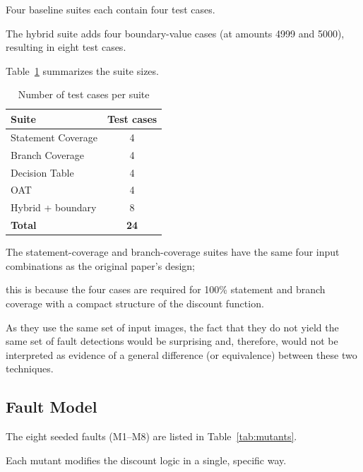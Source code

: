 \documentclass[conference]{IEEEtran}
\begin{document}
\label{sec:suites}

Four baseline suites each contain four test cases.

The hybrid suite adds four boundary-value cases (at amounts 4999 and 5000), resulting in eight test cases.

Table~\ref{tab:testcases} summarizes the suite sizes.



\begin{table}[!t]

\centering

\caption{Number of test cases per suite}

\label{tab:testcases}

\begin{tabular}{|l|c|}
\hline
\textbf{Suite} & \textbf{Test cases} \\
\hline
Statement Coverage & 4 \\
Branch Coverage & 4 \\
Decision Table & 4 \\
OAT & 4 \\
Hybrid + boundary & 8 \\
\hline
\textbf{Total} & \textbf{24} \\
\hline
\end{tabular}

\end{table}



The statement-coverage and branch-coverage suites have the same four input combinations as the original paper's design;

this is because the four cases are required for 100\% statement and branch coverage with a compact structure of the discount function.

As they use the same set of input images, the fact that they do not yield the same set of fault detections would be surprising and, therefore, would not be interpreted as evidence of a general difference (or equivalence) between these two techniques.



\subsection{Fault Model}

\label{sec:mutants}

The eight seeded faults (M1--M8) are listed in Table~\ref{tab:mutants}.

Each mutant modifies the discount logic in a single, specific way.
\end{document}

